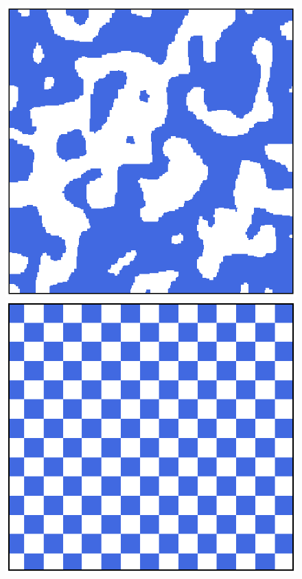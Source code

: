 \begin{figure}[h]
    \centering 
    \hfill\begin{minipage}[t]{0.45\textwidth}
        \centering
        \includegraphics[scale=0.45]{./images/ising/T_001_ferro.eps}
    \end{minipage}%
    \hfill
    \begin{minipage}[t]{0.45\textwidth}
        \centering
        \includegraphics[scale=0.45]{./images/ising/T_n001_ferro.eps}

\end{minipage}
\end{figure}
